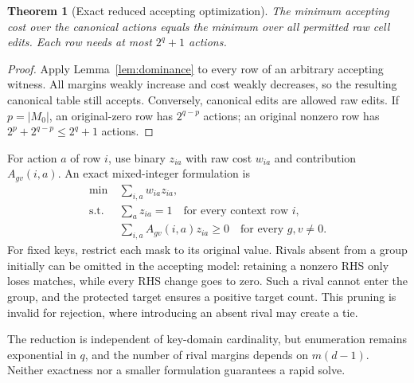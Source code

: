 \documentclass[11pt]{article}
\newtheorem{theorem}{Theorem}
\begin{document}
\begin{theorem}[Exact reduced accepting optimization]\label{thm:accepting}
The minimum accepting cost over the canonical actions equals the minimum over
all permitted raw cell edits. Each row needs at most $2^q+1$ actions.
\end{theorem}
\begin{proof}
Apply Lemma~\ref{lem:dominance} to every row of an arbitrary accepting witness.
All margins weakly increase and cost weakly decreases, so the resulting
canonical table still accepts. Conversely, canonical edits are allowed raw
edits. If $p=|M_0|$, an original-zero row has $2^{q-p}$ actions; an original
nonzero row has $2^p+2^{q-p}\leq2^q+1$ actions.
\end{proof}

For action $a$ of row $i$, use binary $z_{ia}$ with raw cost $w_{ia}$ and
contribution $A_{gv}(i,a)$. An exact mixed-integer formulation is
\begin{align*}
 \min\ &\sum_{i,a}w_{ia}z_{ia},\\
 \text{s.t. }&\sum_a z_{ia}=1\quad\text{for every context row }i,\\
 &\sum_{i,a}A_{gv}(i,a)z_{ia}\geq0\quad\text{for every }g,v\ne0.
\end{align*}
For fixed keys, restrict each mask to its original value. Rivals absent from a
group initially can be omitted in the accepting model: retaining a nonzero RHS
only loses matches, while every RHS change goes to zero. Such a rival cannot
enter the group, and the protected target ensures a positive target count.
This pruning is invalid for rejection, where introducing an absent rival may
create a tie.

The reduction is independent of key-domain cardinality, but enumeration remains
exponential in $q$, and the number of rival margins depends on $m(d-1)$.
Neither exactness nor a smaller formulation guarantees a rapid solve.
\end{document}

